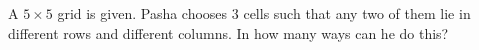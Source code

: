 A $5\times5$ grid is given. Pasha chooses $3$ cells such that any two of them lie in different rows and different columns. In how many ways can he do this?
